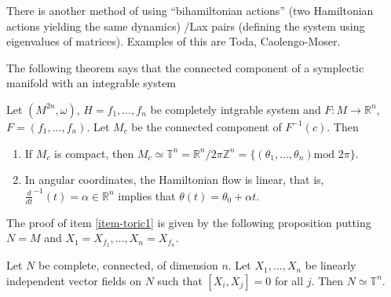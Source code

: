 There is another method of using ``bihamiltonian actions''
(two Hamiltonian actions yielding the same dynamics)
/Lax pairs (defining the system using eigenvalues of matrices).
Examples of this are Toda, Caolengo-Moser.

\medskip\noindent
The following theorem says that the connected
component of a symplectic manifold with an integrable system


\begin{theorem}
\label{theorem-arnold-liouville}
Let $(M^{2n},\omega)$, $H=f_1,\ldots,f_n$ be completely intgrable system
and $F:M \to \mathbb{R}^n$, $F=(f_1,\ldots,f_n)$.
Let $M_c$ be the connected component of $F^{-1}(c)$.
Then
\begin{enumerate}
\item 
\label{item-toric1}
If $M_c$ is compact, then $M_c \simeq
\mathbb{T}^n=\mathbb{R}^n/2\pi\mathbb{Z}^n=\{(\theta_1,\ldots,\theta_n) \text{
mod }2\pi\}$.

\item 
\label{item-toric2}
In angular coordinates, the Hamiltonian flow is linear, that is,
$\frac{d}{dt}^{-1}(t)=\alpha \in \mathbb{R}^n$ 
implies that $\theta(t)=\theta_0+\alpha t$.
\end{enumerate}
\end{theorem}

The proof of item \ref{item-toric1} is given by
the following proposition
putting $N=M$ and $X_1=X_{f_1},\ldots,X_n=X_{f_n}$.

\begin{proposition}
\label{proposition-torus}
Let $N$ be complete, connected, of dimension $n$.
Let $X_1,\ldots,X_n$ be linearly independent vector fields on $N$ 
such that $[X_i,X_j]=0$ for all $j$.
Then $N \simeq \mathbb{T}^n$.
\end{proposition}

